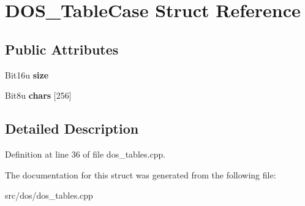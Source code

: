 \hypertarget{structDOS__TableCase}{\section{D\-O\-S\-\_\-\-Table\-Case Struct Reference}
\label{structDOS__TableCase}
}
\subsection*{Public Attributes}
\begin{DoxyCompactItemize}
\item 
\hypertarget{structDOS__TableCase_aa37ae3c4e7b692b2d03feb6048acc20c}{Bit16u {\bfseries size}}\label{structDOS__TableCase_aa37ae3c4e7b692b2d03feb6048acc20c}

\item 
\hypertarget{structDOS__TableCase_ab2e496ce3c2d3bbdb820be16c0a4cd74}{Bit8u {\bfseries chars} \mbox{[}256\mbox{]}}\label{structDOS__TableCase_ab2e496ce3c2d3bbdb820be16c0a4cd74}

\end{DoxyCompactItemize}


\subsection{Detailed Description}


Definition at line 36 of file dos\-\_\-tables.\-cpp.



The documentation for this struct was generated from the following file\-:\begin{DoxyCompactItemize}
\item 
src/dos/dos\-\_\-tables.\-cpp\end{DoxyCompactItemize}
